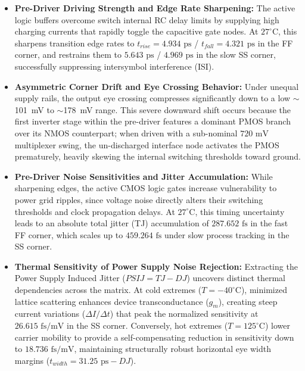 \begin{itemize}
    \item \textbf{Pre-Driver Driving Strength and Edge Rate Sharpening:} The active logic buffers overcome switch internal RC delay limits by supplying high charging currents that rapidly toggle the capacitive gate nodes. At $27^{\circ}\text{C}$, this sharpens transition edge rates to $t_{rise} = 4.934\text{ ps}$ / $t_{fall} = 4.321\text{ ps}$ in the FF corner, and restrains them to $5.643\text{ ps}$ / $4.969\text{ ps}$ in the slow SS corner, successfully suppressing intersymbol interference (ISI).
    
    \item \textbf{Asymmetric Corner Drift and Eye Crossing Behavior:} Under unequal supply rails, the output eye crossing compresses significantly down to a low $\sim$101~mV to $\sim$178~mV range. This severe downward shift occurs because the first inverter stage within the pre-driver features a dominant PMOS branch over its NMOS counterpart; when driven with a sub-nominal $720\text{ mV}$ multiplexer swing, the un-discharged interface node activates the PMOS prematurely, heavily skewing the internal switching thresholds toward ground.
    
    \item \textbf{Pre-Driver Noise Sensitivities and Jitter Accumulation:} While sharpening edges, the active CMOS logic gates increase vulnerability to power grid ripples, since voltage noise directly alters their switching thresholds and clock propagation delays. At $27^{\circ}\text{C}$, this timing uncertainty leads to an absolute total jitter (TJ) accumulation of $287.652\text{ fs}$ in the fast FF corner, which scales up to $459.264\text{ fs}$ under slow process tracking in the SS corner.
    
    \item \textbf{Thermal Sensitivity of Power Supply Noise Rejection:} Extracting the Power Supply Induced Jitter ($PSIJ = TJ - DJ$) uncovers distinct thermal dependencies across the matrix. At cold extremes ($T = -40^{\circ}\text{C}$), minimized lattice scattering enhances device transconductance ($g_m$), creating steep current variations ($\Delta I/\Delta t$) that peak the normalized sensitivity at $26.615\text{ fs/mV}$ in the SS corner. Conversely, hot extremes ($T = 125^{\circ}\text{C}$) lower carrier mobility to provide a self-compensating reduction in sensitivity down to $18.736\text{ fs/mV}$, maintaining structurally robust horizontal eye width margins ($t_{width} = 31.25\text{ ps} - DJ$).
\end{itemize}

